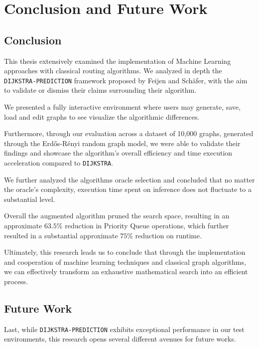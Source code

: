 \chapter{Conclusion and Future Work}
\label{ch:conclusion}

\section{Conclusion}
\label{sec:conclusion}

This thesis extensively examined the implementation of Machine Learning approaches with classical routing algorithms. We analyzed in depth the \texttt{DIJKSTRA-PREDICTION} framework proposed by Feijen and Schäfer, with the aim to validate or dismiss their claims surrounding their algorithm.

We presented a fully interactive environment where users may generate, save, load and edit graphs to see visualize the algorithmic differences.

Furthermore, through our evaluation across a dataset of 10,000 graphs, generated through the Erdős-Rényi random graph model, we were able to validate their findings and showcase the algorithm's overall efficiency and time execution acceleration compared to \texttt{DIJKSTRA}.

We further analyzed the algorithms oracle selection and concluded that no matter the oracle's complexity, execution time spent on inference does not fluctuate to a substantial level.

Overall the augmented algorithm pruned the search space, resulting in an approximate $63.5\%$ reduction in Priority Queue operations, which further resulted in a substantial approximate $75\%$ reduction on runtime.

Ultimately, this research leads us to conclude that through the implementation and cooperation of machine learning techniques and classical graph algorithms, we can effectively transform an exhaustive mathematical search into an efficient process.

\section{Future Work}
\label{sec:future_work}

Last, while \texttt{DIJKSTRA-PREDICTION} exhibits exceptional performance in our test environments, this research opens several different avenues for future works.

